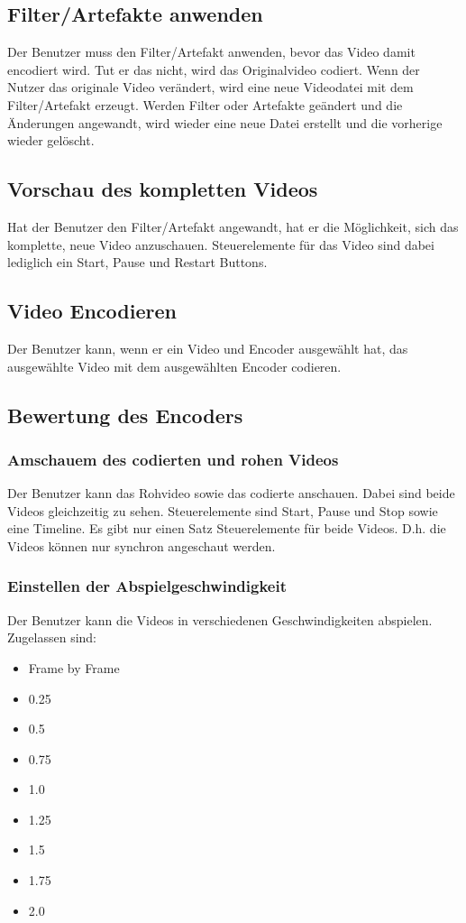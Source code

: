 \documentclass[parskip=full]{scrartcl}
\begin{document}
\subsection{Filter/Artefakte anwenden}
Der Benutzer muss den Filter/Artefakt anwenden, bevor das Video damit encodiert wird. Tut er
das nicht, wird das Originalvideo codiert. Wenn der Nutzer das originale Video verändert, wird eine neue Videodatei mit
dem Filter/Artefakt erzeugt. Werden Filter oder Artefakte geändert und die Änderungen angewandt, wird wieder eine neue
Datei erstellt und die vorherige wieder gelöscht.
\subsection{Vorschau des kompletten Videos}
Hat der Benutzer den Filter/Artefakt angewandt, hat er die Möglichkeit, sich das komplette, neue
Video anzuschauen. Steuerelemente für das Video sind dabei lediglich ein Start, Pause und Restart Buttons.
\subsection{Video Encodieren}
Der Benutzer kann, wenn er ein Video und Encoder ausgewählt hat, das ausgewählte Video mit dem ausgewählten Encoder codieren.
\subsection{Bewertung des Encoders}
\subsubsection{Amschauem des codierten und rohen Videos}
Der Benutzer kann das Rohvideo sowie das codierte anschauen. Dabei sind beide Videos gleichzeitig zu sehen. Steuerelemente sind Start, Pause und Stop sowie eine Timeline. Es gibt nur einen Satz Steuerelemente für beide Videos. D.h. die Videos können nur synchron angeschaut werden.
\subsubsection{Einstellen der Abspielgeschwindigkeit}
Der Benutzer kann die Videos in verschiedenen Geschwindigkeiten abspielen. Zugelassen sind:
\begin{itemize}
\item Frame by Frame
\item 0.25
\item 0.5
\item 0.75
\item 1.0
\item 1.25
\item 1.5
\item 1.75
\item 2.0
\end{itemize}
\end{document}
